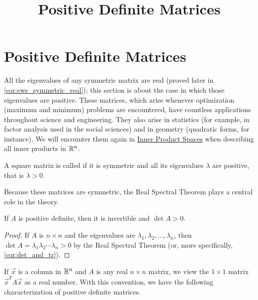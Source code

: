 \documentclass{ximera}
\title{Positive Definite Matrices} \license{CC BY-NC-SA 4.0}
\begin{document}
\begin{abstract}

\end{abstract}
\maketitle

\section*{Positive Definite Matrices}
All the eigenvalues of any symmetric
matrix are real (proved later in \ref{cor:ews_symmetric_real}); this section is about the case in which those eigenvalues
 are positive. These matrices, which arise whenever optimization
(maximum and minimum) problems are encountered, have countless
applications throughout science and engineering. They also arise in
statistics (for example, in factor analysis used in the social sciences)
 and in geometry (quadratic forms, for instance). We will encounter them again in \href{https://ximera.osu.edu/oerlinalg/LinearAlgebra/VSP-0070/main}{Inner Product Spaces} when describing all inner products in $\mathbb{R}^n$.


\begin{definition}\label{def:024811}
A square matrix is called  if it is symmetric and all its eigenvalues $\lambda$ are positive, that is $\lambda > 0$.
\end{definition}

Because these matrices are symmetric, the Real Spectral Theorem plays a central role in the theory.


\begin{theorem}\label{thm:024815}
If $A$ is positive definite, then it is invertible and $\det A > 0$.
\end{theorem}

\begin{proof}
If $A$ is $n \times n$ and the eigenvalues are $\lambda_{1}, \lambda_{2}, \dots, \lambda_{n}$, then $\det A = \lambda_{1}\lambda_{2} \cdots \lambda_{n} > 0$ by the Real Spectral Theorem (or, more specifically, \ref{cor:det_and_tr}).
\end{proof}

If $\vec{x}$ is a column in $\mathbb{R}^n$ and $A$ is any real $n \times n$ matrix, we view the $1 \times 1$ matrix $\vec{x}^{T}A\vec{x}$ as a real number. With this convention, we have the following characterization of positive definite matrices.
\end{document}
